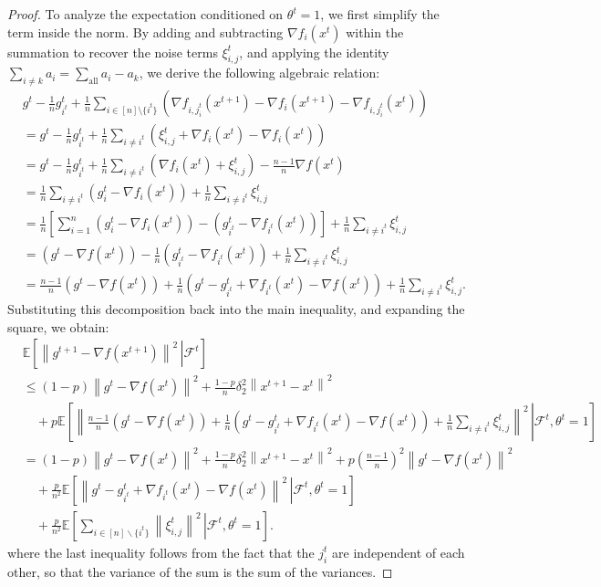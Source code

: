 \documentclass{article}
\newcommand{\sqn}[1]{\left\| #1 \right\|^2}
\newcommand{\Expb}[2]{\mathbb{E}\!\left[\left. #1\,\right|#2 \right]}
\newcommand{\Expc}[1]{\Expb{#1}{\mathcal{F}^t}}
\theoremstyle{plain}
\begin{document}
\begin{proof}
To analyze the expectation conditioned on $\theta^t=1$, we first simplify the term inside the norm. By adding and subtracting $\nabla f_i(x^t)$ within the summation to recover the noise terms $\xi_{i,j}^t$, and applying the identity $\sum_{i \neq k} a_i = \sum_{\text{all}} a_i - a_k$, we derive the following algebraic relation:
\begin{align*}
&g^{t}-\frac{1}{n}g_{i^t}^t+\frac{1}{n}\sum_{i \in [n]\setminus\{i^t\}}\left(\nabla f_{i,j_i^t}(x^{t+1})-\nabla f_{i}(x^{t+1})-\nabla f_{i,j_i^t}(x^{t})\right) \\
&= g^{t}-\frac{1}{n}g_{i^t}^t + \frac{1}{n}\sum_{i \neq i^t} \left( \xi_{i,j}^t + \nabla f_i(x^t) - \nabla f_i(x^t) \right) \\
&= g^{t}-\frac{1}{n}g_{i^t}^t + \frac{1}{n}\sum_{i \neq i^t} \left( \nabla f_i(x^t) + \xi_{i,j}^t \right) - \frac{n-1}{n}\nabla f(x^t) \\ 
&= \frac{1}{n}\sum_{i \neq i^t} \left( g_i^t - \nabla f_i(x^t) \right) + \frac{1}{n}\sum_{i \neq i^t} \xi_{i,j}^t \\
&= \frac{1}{n} \left[ \sum_{i=1}^n (g_i^t - \nabla f_i(x^t)) - (g_{i^t}^t - \nabla f_{i^t}(x^t)) \right] + \frac{1}{n}\sum_{i \neq i^t} \xi_{i,j}^t \\
&= \left( g^t - \nabla f(x^t) \right) - \frac{1}{n}\left( g_{i^t}^t - \nabla f_{i^t}(x^t) \right) + \frac{1}{n}\sum_{i \neq i^t} \xi_{i,j}^t \\
&= \frac{n-1}{n}\left(g^t-\nabla f(x^t)\right) + \frac{1}{n}\left(g^{t}-g_{i^t}^t+\nabla f_{i^t}(x^{t})-\nabla f(x^{t})\right) + \frac{1}{n}\sum_{i \neq i^t} \xi_{i,j}^t.
\end{align*}
Substituting this decomposition back into the main inequality, and expanding the square, we obtain:
\begin{align*}
&\Expc{\sqn{g^{t+1}-\nabla f(x^{t+1})}} \\
&\leq (1-p)\sqn{g^{t}-\nabla f(x^{t})} + \frac{1-p}{n} \delta_2^2\sqn{x^{t+1}-x^t} \\
&\quad + p \Expb{\left\| \frac{n-1}{n}\left(g^t-\nabla f(x^t)\right) + \frac{1}{n}\left(g^{t}-g_{i^t}^t+\nabla f_{i^t}(x^{t})-\nabla f(x^{t})\right) + \frac{1}{n}\sum_{i \neq i^t} \xi_{i,j}^t \right\|^2}{\mathcal{F}^t,\theta^t=1} \\
&= (1-p)\sqn{g^{t}-\nabla f(x^{t})}+\frac{1-p}{n} \delta_2^2\sqn{x^{t+1}-x^t} + p \left(\frac{n-1}{n}\right)^2 \sqn{g^t-\nabla f(x^t)} \\
&\quad +\frac{p}{n^2}\Expb{\sqn{g^{t}-g_{i^t}^t+\nabla f_{i^t}(x^{t})-\nabla f(x^{t})}}{\mathcal{F}^t,\theta^t=1} \\
&\quad+\frac{p}{n^2}\Expb{\sum_{i\in[n]\backslash\{i^t\}}\sqn{\xi_{i,j}^t}}{\mathcal{F}^t,\theta^t=1}.
\end{align*}
where the last inequality follows from the fact that the $j_i^t$ are independent of each other, so that the variance of the sum is the sum of the variances. 


\end{proof}
\end{document}
